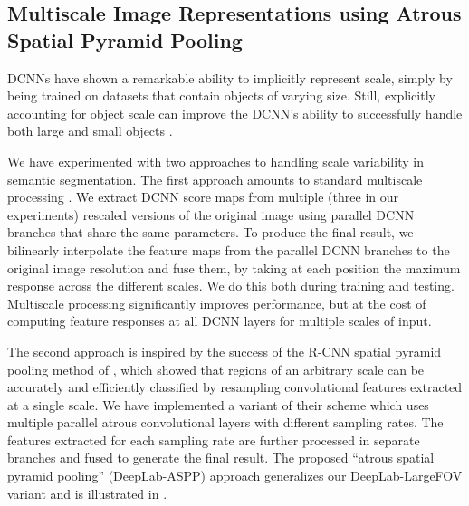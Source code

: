 \subsection{Multiscale Image Representations using Atrous Spatial Pyramid Pooling}

DCNNs have shown a remarkable
ability to implicitly represent scale, simply by being trained on datasets that
contain objects of varying size. Still, explicitly accounting for object scale
can improve the DCNN's ability to successfully handle both
large and small objects \cite{papandreou2014untangling}.

We have experimented with two approaches to handling
 scale variability in semantic segmentation.
The first approach amounts to standard multiscale
processing \cite{chen2015attention, kokkinos2016pushing}. We extract DCNN score
maps from multiple (three in our experiments) rescaled versions of the original
image using parallel DCNN branches that share the same parameters. To produce
the final result, we bilinearly interpolate the feature maps from the parallel
DCNN branches to the original image resolution and fuse them, by taking at each
position the maximum response across the different scales. We do this both
during training and testing. Multiscale processing significantly improves
performance, but at the cost of computing feature responses at all DCNN layers for
multiple scales of input. 

The second approach is inspired by the success of the R-CNN spatial pyramid pooling method of \cite{he2014spatial},
which showed that regions of an arbitrary scale can be accurately and efficiently classified by resampling 
convolutional features extracted at a single scale.
 We have implemented a variant of their scheme which uses multiple
parallel atrous convolutional layers with different sampling rates. The features extracted for each sampling
rate are further processed in separate branches and fused to generate the final
result. The proposed ``atrous spatial pyramid pooling'' (DeepLab-ASPP) approach
generalizes our DeepLab-LargeFOV variant and is illustrated in .


